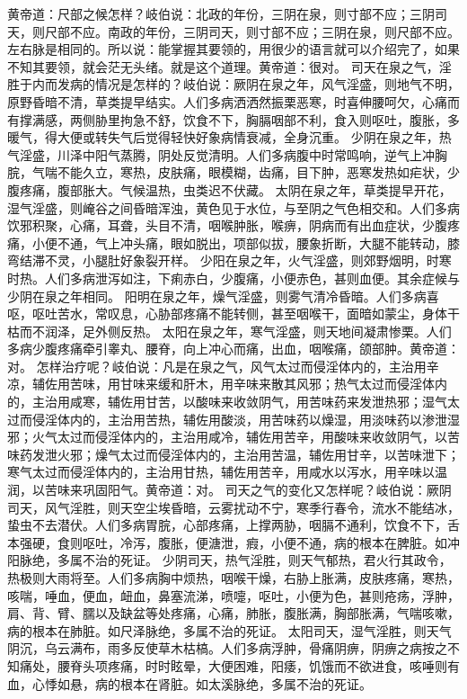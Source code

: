 \documentclass[a4paper,12pt,UTF8,twoside]{ctexbook}
\begin{document}
黄帝道：尺部之候怎样？岐伯说：北政的年份，三阴在泉，则寸部不应；三阴司天，则尺部不应。南政的年份，三阴司天，则寸部不应；三阴在泉，则尺部不应。左右脉是相同的。所以说：能掌握其要领的，用很少的语言就可以介绍完了，如果不知其要领，就会茫无头绪。就是这个道理。黄帝道：很对。
司天在泉之气，淫胜于内而发病的情况是怎样的？岐伯说：厥阴在泉之年，风气淫盛，则地气不明，原野昏暗不清，草类提早结实。人们多病洒洒然振栗恶寒，时喜伸腰呵欠，心痛而有撑满感，两侧胁里拘急不舒，饮食不下，胸膈咽部不利，食入则呕吐，腹胀，多暖气，得大便或转失气后觉得轻快好象病情衰减，全身沉重。
少阴在泉之年，热气淫盛，川泽中阳气蒸腾，阴处反觉清明。人们多病腹中时常鸣响，逆气上冲胸脘，气喘不能久立，寒热，皮肤痛，眼模糊，齿痛，目下肿，恶寒发热如疟状，少腹疼痛，腹部胀大。气候温热，虫类迟不伏藏。
太阴在泉之年，草类提早开花，湿气淫盛，则崦谷之间昏暗浑浊，黄色见于水位，与至阴之气色相交和。人们多病饮邪积聚，心痛，耳聋，头目不清，咽喉肿胀，喉痹，阴病而有出血症状，少腹疼痛，小便不通，气上冲头痛，眼如脱出，项部似拔，腰象折断，大腿不能转动，膝弯结滞不灵，小腿肚好象裂开样。
少阳在泉之年，火气淫盛，则郊野烟明，时寒时热。人们多病泄泻如注，下痢赤白，少腹痛，小便赤色，甚则血便。其余症候与少阴在泉之年相同。
阳明在泉之年，燥气淫盛，则雾气清冷昏暗。人们多病喜呕，呕吐苦水，常叹息，心胁部疼痛不能转侧，甚至咽喉干，面暗如蒙尘，身体干枯而不润泽，足外侧反热。
太阳在泉之年，寒气淫盛，则天地间凝肃惨栗。人们多病少腹疼痛牵引睾丸、腰脊，向上冲心而痛，出血，咽喉痛，颌部肿。黄帝道：对。
怎样治疗呢？岐伯说：凡是在泉之气，风气太过而侵淫体内的，主治用辛凉，辅佐用苦味，用甘味来缓和肝木，用辛味来散其风邪；热气太过而侵淫体内的，主治用咸寒，辅佐用甘苦，以酸味来收敛阴气，用苦味药来发泄热邪；湿气太过而侵淫体内的，主治用苦热，辅佐用酸淡，用苦味药以燥湿，用淡味药以渗泄湿邪；火气太过而侵淫体内的，主治用咸冷，辅佐用苦辛，用酸味来收敛阴气，以苦味药发泄火邪；燥气太过而侵淫体内的，主治用苦温，辅佐用甘辛，以苦味泄下；寒气太过而侵淫体内的，主治用甘热，辅佐用苦辛，用咸水以泻水，用辛味以温润，以苦味来巩固阳气。黄帝道：对。
司天之气的变化又怎样呢？岐伯说：厥阴司天，风气淫胜，则天空尘埃昏暗，云雾扰动不宁，寒季行春令，流水不能结冰，蛰虫不去潜伏。人们多病胃脘，心部疼痛，上撑两胁，咽膈不通利，饮食不下，舌本强硬，食则呕吐，冷泻，腹胀，便溏泄，瘕，小便不通，病的根本在脾脏。如冲阳脉绝，多属不治的死证。
少阴司天，热气淫胜，则天气郁热，君火行其政令，热极则大雨将至。人们多病胸中烦热，咽喉干燥，右胁上胀满，皮肤疼痛，寒热，咳喘，唾血，便血，衄血，鼻塞流涕，喷嚏，呕吐，小便为色，甚则疮疡，浮肿，肩、背、臂、臑以及缺盆等处疼痛，心痛，肺胀，腹胀满，胸部胀满，气喘咳嗽，病的根本在肺脏。如尺泽脉绝，多属不治的死证。
太阳司天，湿气淫胜，则天气阴沉，乌云满布，雨多反使草木枯槁。人们多病浮肿，骨痛阴痹，阴痹之病按之不知痛处，腰脊头项疼痛，时时眩晕，大便困难，阳痿，饥饿而不欲进食，咳唾则有血，心悸如悬，病的根本在肾脏。如太溪脉绝，多属不治的死证。
\end{document}
